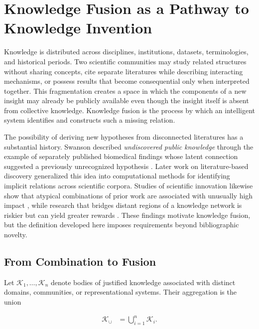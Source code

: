 \section{\textbf{Knowledge Fusion as a Pathway to Knowledge Invention}}
\label{sec:knowledge_fusion}

Knowledge is distributed across disciplines, institutions, datasets,
terminologies, and historical periods. Two scientific communities may study
related structures without sharing concepts, cite separate literatures while
describing interacting mechanisms, or possess results that become
consequential only when interpreted together. This fragmentation creates a
space in which the components of a new insight may already be publicly
available even though the insight itself is absent from collective knowledge.
Knowledge fusion is the process by which an intelligent system identifies and
constructs such a missing relation.

The possibility of deriving new hypotheses from disconnected literatures has
a substantial history. Swanson described \emph{undiscovered public knowledge}
through the example of separately published biomedical findings whose latent
connection suggested a previously unrecognized hypothesis
\cite{swanson1986fish}. Later work on literature-based discovery generalized
this idea into computational methods for identifying implicit relations across
scientific corpora. Studies of scientific innovation likewise show that
atypical combinations of prior work are associated with unusually high impact
\cite{uzzi2013atypical}, while research that bridges distant regions of a
knowledge network is riskier but can yield greater rewards
\cite{foster2015tradition}. These findings motivate knowledge fusion, but the
definition developed here imposes requirements beyond bibliographic novelty.

\subsection{\textbf{From Combination to Fusion}}

Let $\mathcal{K}_{1},\ldots,\mathcal{K}_{n}$ denote bodies of justified
knowledge associated with distinct domains, communities, or representational
systems. Their aggregation is the union

\begin{equation}
\begin{aligned}
\mathcal{K}_{\cup}
&=\bigcup_{i=1}^{n}\mathcal{K}_{i}.
\end{aligned}
\label{eq:knowledge_union}
\end{equation}

